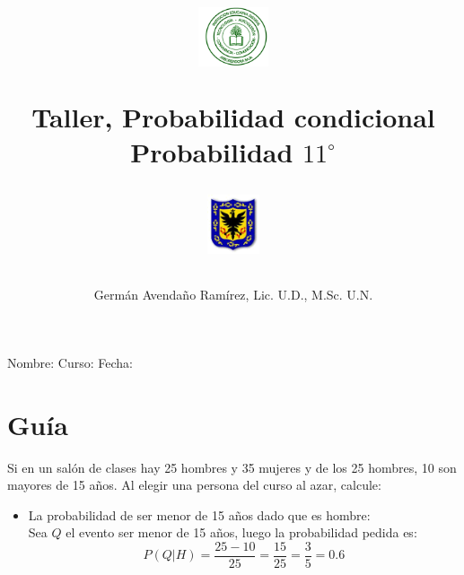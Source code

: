 \documentclass[10pt,twoside]{article}
\author{Germ\'an Avenda\~no Ram\'irez, Lic. U.D., M.Sc. U.N.}
\title{\begin{minipage}{.2\textwidth}
\includegraphics[height=1.75cm]{Images/logo-colegio.png}\end{minipage}
\begin{minipage}{.55\textwidth}
\begin{center}
Taller, Probabilidad condicional  \\
Probabilidad $11^{\circ}$
\end{center}
\end{minipage}\hfill
\begin{minipage}{.2\textwidth}
\includegraphics[height=1.75cm]{Images/logo-sed.png} 
\end{minipage}}
\date{}
\begin{document}
\maketitle
Nombre: \hrulefill Curso: \underline{\hspace*{44pt}} Fecha: \underline{\hspace*{2.5cm}}
\section*{Gu\'{i}a}
Si en un sal\'{o}n de clases  hay 25 hombres y 35 mujeres y de los 25 hombres, 10 son mayores de 15 años. Al elegir una persona del curso al azar, calcule:
\begin{itemize}
\item La probabilidad de ser menor de 15 años dado que es hombre:\\

Sea $Q$ el evento ser menor de 15 años, luego la probabilidad pedida es:
\[P(Q|H)=\dfrac{25-10}{25}=\dfrac{15}{25}=\dfrac{3}{5}=0.6\]
\end{itemize}
\end{document}
